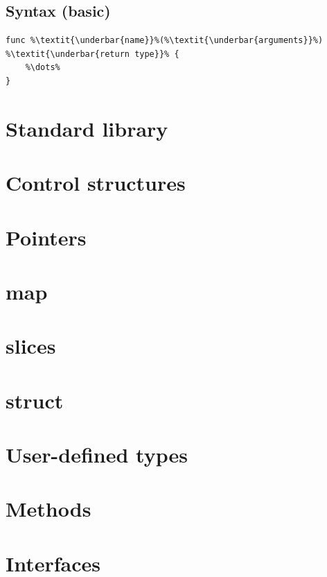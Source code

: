 \documentclass{article}
\begin{document}
\begin{multicols*}{3}
  \subsection*{Syntax (basic)}

  \begin{lstlisting}[numbers=none,escapechar=\%]
func %\textit{\underbar{name}}%(%\textit{\underbar{arguments}}%) %\textit{\underbar{return type}}% {
    %\dots%
}
\end{lstlisting}

  \filbreak
  \section*{Standard library}

  \filbreak
  \section*{Control structures}

  \filbreak
  \section*{Pointers}

  \filbreak
  \section*{map}

  \filbreak
  \section*{slices}

  \filbreak
  \section*{struct}

  \filbreak
  \section*{User-defined types}

  \filbreak
  \section*{Methods}

  \filbreak
  \section*{Interfaces}


\end{multicols*}
\end{document}
